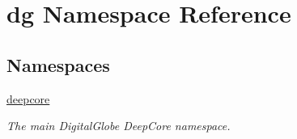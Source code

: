 \hypertarget{namespacedg}{}\section{dg Namespace Reference}
\label{namespacedg}
\subsection*{Namespaces}
\begin{DoxyCompactItemize}
\item 
 \hyperlink{namespacedg_1_1deepcore}{deepcore}
\begin{DoxyCompactList}\small\item\em The main Digital\+Globe Deep\+Core namespace. \end{DoxyCompactList}\end{DoxyCompactItemize}
